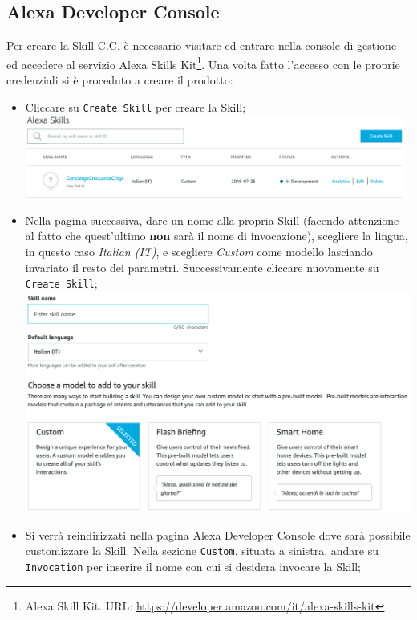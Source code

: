 \subsection{Alexa Developer Console}
Per creare la Skill C.C. è necessario visitare ed entrare nella console di gestione ed accedere al servizio Alexa Skills Kit\footnote{Alexa Skill Kit. URL: \href{https://developer.amazon.com/it/alexa-skills-kit}{https://developer.amazon.com/it/alexa-skills-kit}}. Una volta fatto l’accesso con le proprie credenziali si è proceduto a creare il prodotto:
\begin{itemize}
	\item Cliccare su \texttt{Create Skill} per creare la Skill;\\
	\includegraphics[width=12.5cm]{immagini/alexa-console-dev1.png}
	\item Nella pagina successiva, dare un nome alla propria Skill (facendo attenzione al fatto che quest'ultimo \textbf{non} sarà il nome di invocazione), scegliere la lingua, in questo caso \textit{Italian (IT)}, e scegliere \textit{Custom} come modello lasciando invariato il resto dei parametri. Successivamente cliccare nuovamente su \texttt{Create Skill};\\
	\includegraphics[width=13cm]{immagini/alexa-console-dev2.png}\\
	\newpage
	\item Si verrà reindirizzati nella pagina Alexa Developer Console dove sarà possibile customizzare la Skill. Nella sezione \texttt{Custom}, situata a sinistra, andare su \texttt{Invocation} per inserire il nome con cui si desidera invocare la Skill;\\[0.5cm]

\end{itemize}
